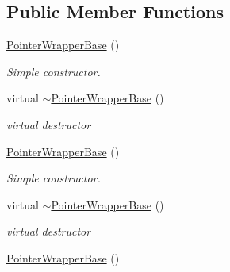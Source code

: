 \subsection*{Public Member Functions}
\begin{DoxyCompactItemize}
\item 
\hypertarget{classPointerWrapperBase_ac9e248557a8aa248bcbbadc469c77f52}{\hyperlink{classPointerWrapperBase_ac9e248557a8aa248bcbbadc469c77f52}{Pointer\-Wrapper\-Base} ()}\label{classPointerWrapperBase_ac9e248557a8aa248bcbbadc469c77f52}

\begin{DoxyCompactList}\small\item\em Simple constructor. \end{DoxyCompactList}\item 
\hypertarget{classPointerWrapperBase_a842fb0af38187d71678971452c1e1094}{virtual \hyperlink{classPointerWrapperBase_a842fb0af38187d71678971452c1e1094}{$\sim$\-Pointer\-Wrapper\-Base} ()}\label{classPointerWrapperBase_a842fb0af38187d71678971452c1e1094}

\begin{DoxyCompactList}\small\item\em virtual destructor \end{DoxyCompactList}\item 
\hypertarget{classPointerWrapperBase_ac9e248557a8aa248bcbbadc469c77f52}{\hyperlink{classPointerWrapperBase_ac9e248557a8aa248bcbbadc469c77f52}{Pointer\-Wrapper\-Base} ()}\label{classPointerWrapperBase_ac9e248557a8aa248bcbbadc469c77f52}

\begin{DoxyCompactList}\small\item\em Simple constructor. \end{DoxyCompactList}\item 
\hypertarget{classPointerWrapperBase_a842fb0af38187d71678971452c1e1094}{virtual \hyperlink{classPointerWrapperBase_a842fb0af38187d71678971452c1e1094}{$\sim$\-Pointer\-Wrapper\-Base} ()}\label{classPointerWrapperBase_a842fb0af38187d71678971452c1e1094}

\begin{DoxyCompactList}\small\item\em virtual destructor \end{DoxyCompactList}\item 
\hypertarget{classPointerWrapperBase_ac9e248557a8aa248bcbbadc469c77f52}{\hyperlink{classPointerWrapperBase_ac9e248557a8aa248bcbbadc469c77f52}{Pointer\-Wrapper\-Base} ()}\label{classPointerWrapperBase_ac9e248557a8aa248bcbbadc469c77f52}


\end{DoxyCompactItemize}
